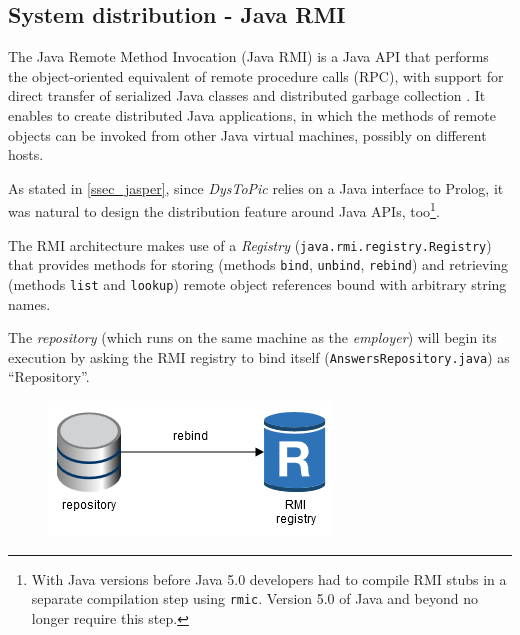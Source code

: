 \documentclass[a4paper, 11pt, oneside]{duthesis}
\begin{document}

\subsection{System distribution - Java RMI}


The Java Remote Method Invocation (Java RMI) is a Java API that performs the object-oriented equivalent of remote procedure calls (RPC), with support for direct transfer of serialized Java classes and distributed garbage collection \cite{rmi}.
It enables to create distributed Java applications, in which the methods of remote objects can be invoked from other Java virtual machines, possibly on different hosts\cite{oracle_rmi}.

As stated in \ref{ssec_jasper}, since \emph{DysToPic} relies on a Java interface to Prolog, it was natural to design the distribution feature around Java APIs, too\footnote{With Java versions before Java 5.0 developers had to compile RMI stubs in a separate compilation step using \texttt{rmic}. Version 5.0 of Java and beyond no longer require this step.}.

The RMI architecture makes use of a \emph{Registry} (\verb$java.rmi.registry.Registry$) that provides methods for storing (methods \texttt{bind}, \texttt{unbind}, \texttt{rebind}) and retrieving (methods \texttt{list} and \texttt{lookup}) remote object references bound with arbitrary string names.\\

\newpage

The \emph{repository} (which runs on the same machine as the \emph{employer}) will begin its execution by asking the RMI registry to bind itself (\verb$AnswersRepository.java$) as ``Repository''.

\begin{figure}[H]
\centering
\includegraphics[scale=.7]{img/DIAG_11.png}
\caption{}
\label{}
\end{figure}
\end{document}
